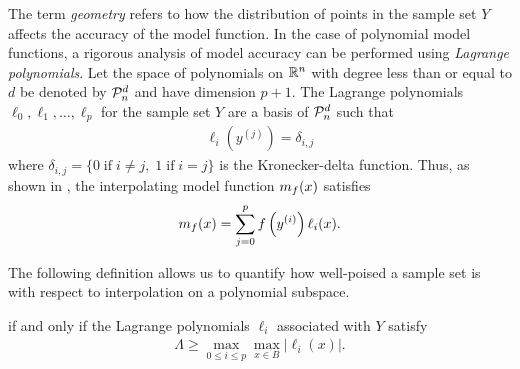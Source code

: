 \documentclass{article}
\begin{document}
\label{geometry}
The term \emph{geometry} refers to  how the distribution of points in the sample set $Y$ affects the accuracy of the model function.     In the case of polynomial model functions, a rigorous analysis of model accuracy can be performed using \emph{Lagrange polynomials}.
Let the space of polynomials on $\mathbb R^n$ with degree less than or equal to $d$ be denoted by $\mathcal{P}^d_n$ and have dimension $p+1$.
The Lagrange polynomials $\ell_0, \ell_1, \ldots, \ell_p$ for the sample set $Y$ are a basis of $\mathcal{P}^d_n$ such that
\begin{align}
\ell_i(y^{(j)}) = \delta_{i,j}  \label{interpolation_condition_lagrange}
\end{align}
where $\delta_{i,j} = \{0 \;\text{if}\; i\ne j,\; 1 \;\text{if} \; i = j \}$ is the Kronecker-delta function.
Thus, as shown in \cite{introduction_book},  the interpolating model function ${{m}_f}(x)$ 
satisfies
\begin{align}
\label{reg} 
{{m}_f}(x) = \sum^p_{j=0}f\left(y^{(i)}\right)\ell_i(x).
\end{align}

The following definition allows us to quantify how well-poised a sample set is with respect to interpolation on a polynomial subspace.


\begin{definition}\label{lambda-poised}
if and only if the Lagrange polynomials $\ell_i$ associated with $Y$ satisfy
\begin{align}
\Lambda \ge \max_{0\le i\le p}\max_{x\in B}|\ell_i(x)|.
\end{align}
\end{definition}
\end{document}
